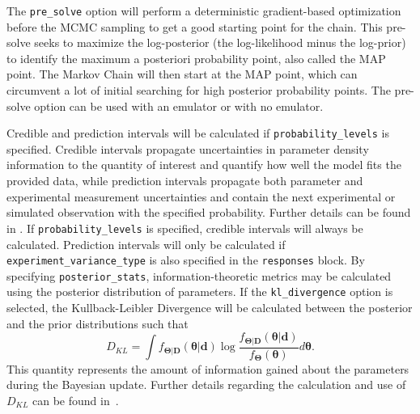 The \texttt{pre\_solve} option will perform a deterministic
gradient-based optimization before the MCMC sampling to get a good
starting point for the chain.  This pre-solve seeks to maximize the
log-posterior (the log-likelihood minus the log-prior) to identify the
maximum a posteriori probability point, also called the MAP point.
The Markov Chain will then start at the MAP point, which can
circumvent a lot of initial searching for high posterior probability
points.  The pre-solve option can be used with an emulator or with no
emulator.

Credible and prediction intervals will be calculated if 
\texttt{probability\_levels} is specified. Credible intervals propagate 
uncertainties in parameter density information to the quantity of interest
and quantify how well the model fits the provided data, while prediction 
intervals propagate both parameter and experimental measurement uncertainties 
and contain the next experimental or simulated observation with the specified 
probability. Further details can be found in \cite{Smith2013}. If
\texttt{probability\_levels} is specified, credible intervals will always be 
calculated. Prediction intervals will only be calculated if 
\texttt{experiment\_variance\_type} is also specified in the \texttt{responses} 
block. 
By specifying \texttt{posterior\_stats}, information-theoretic metrics may be 
calculated using the posterior distribution of parameters. If the 
\texttt{kl\_divergence} option is selected, the Kullback-Leibler Divergence
will be calculated between the posterior and the prior distributions such that
\begin{equation}
D_{KL} = \int {f_{\boldsymbol{\Theta |D}}}\left( \boldsymbol{\theta |d} \right) 
\log \frac{ {f_{\boldsymbol{\Theta |D}}}\left( \boldsymbol{\theta |d} \right) }
{{f_{\boldsymbol{\Theta}}}\left( \boldsymbol{\theta}  \right)} 
d\boldsymbol{\theta}.
\end{equation} 
This quantity represents the amount of information gained about the parameters
during the Bayesian update. Further details regarding the calculation and use
of $D_{KL}$ can be found in~\cite{TheoMan}.

